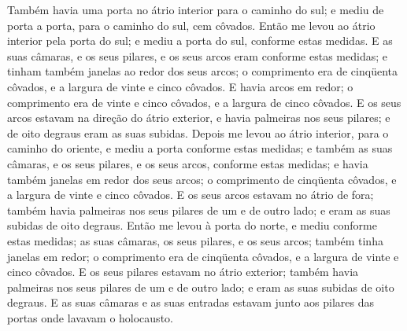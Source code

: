 Também havia uma porta no átrio interior para o caminho do sul; e
mediu de porta a porta, para o caminho do sul, cem côvados.
Então me levou ao átrio interior pela porta do sul; e mediu a
porta do sul, conforme estas medidas. E as suas câmaras, e os
seus pilares, e os seus arcos eram conforme estas medidas; e tinham
também janelas ao redor dos seus arcos; o comprimento era de
cinqüenta côvados, e a largura de vinte e cinco côvados. E
havia arcos em redor; o comprimento era de vinte e cinco côvados, e
a largura de cinco côvados. E os seus arcos estavam na
direção do átrio exterior, e havia palmeiras nos seus pilares; e de
oito degraus eram as suas subidas. Depois me levou ao átrio
interior, para o caminho do oriente, e mediu a porta conforme estas
medidas; e também as suas câmaras, e os seus pilares, e os
seus arcos, conforme estas medidas; e havia também janelas em redor
dos seus arcos; o comprimento de cinqüenta côvados, e a largura de
vinte e cinco côvados. E os seus arcos estavam no átrio de
fora; também havia palmeiras nos seus pilares de um e de outro lado;
e eram as suas subidas de oito degraus. Então me levou à
porta do norte, e mediu conforme estas medidas; as suas
câmaras, os seus pilares, e os seus arcos; também tinha janelas em
redor; o comprimento era de cinqüenta côvados, e a largura de vinte
e cinco côvados. E os seus pilares estavam no átrio exterior;
também havia palmeiras nos seus pilares de um e de outro lado; e
eram as suas subidas de oito degraus. E as suas câmaras e as
suas entradas estavam junto aos pilares das portas onde lavavam o
holocausto.

